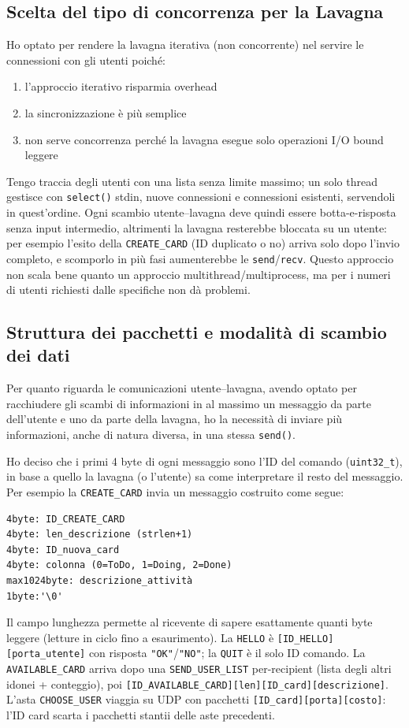\documentclass[10pt,a4paper, titlepage]{article}
\begin{document}
\subsection*{Scelta del tipo di concorrenza per la Lavagna}
Ho optato per rendere la lavagna iterativa (non concorrente) nel servire le connessioni con gli utenti poiché:
\begin{enumerate}
    \item l'approccio iterativo risparmia overhead
    \item la sincronizzazione è più semplice
    \item non serve concorrenza perché la lavagna esegue solo operazioni I/O bound leggere
\end{enumerate}
Tengo traccia degli utenti con una lista senza limite massimo; un solo thread gestisce con \texttt{select()} stdin, nuove connessioni e connessioni esistenti, servendoli in quest'ordine. Ogni scambio utente--lavagna deve quindi essere botta-e-risposta senza input intermedio, altrimenti la lavagna resterebbe bloccata su un utente: per esempio l'esito della \texttt{CREATE\_CARD} (ID duplicato o no) arriva solo dopo l'invio completo, e scomporlo in pi\`u fasi aumenterebbe le \texttt{send}/\texttt{recv}.
Questo approccio non scala bene quanto un approccio multithread/multiprocess, ma per i numeri di utenti richiesti dalle specifiche non dà problemi.
\subsection*{Struttura dei pacchetti e modalità di scambio dei dati}
Per quanto riguarda le comunicazioni utente--lavagna, avendo optato per racchiudere gli scambi di informazioni in al massimo un messaggio da parte dell'utente e uno da parte della lavagna, ho la necessità di inviare più informazioni, anche di natura diversa, in una stessa \texttt{send()}.

Ho deciso che i primi 4 byte di ogni messaggio sono l'ID del comando (\texttt{uint32\_t}), in base a quello la lavagna (o l'utente) sa come interpretare il resto del messaggio. Per esempio la \texttt{CREATE\_CARD} invia un messaggio costruito come segue:
\begin{verbatim}
4byte: ID_CREATE_CARD
4byte: len_descrizione (strlen+1)
4byte: ID_nuova_card
4byte: colonna (0=ToDo, 1=Doing, 2=Done)
max1024byte: descrizione_attività
1byte:'\0'
\end{verbatim}
Il campo lunghezza permette al ricevente di sapere esattamente quanti byte leggere (letture in ciclo fino a esaurimento). La \texttt{HELLO} \`e \texttt{[ID\_HELLO]}\allowbreak\texttt{[porta\_utente]} con risposta \texttt{"OK"}/\texttt{"NO"}; la \texttt{QUIT} \`e il solo ID comando. La \texttt{AVAILABLE\_CARD} arriva dopo una \texttt{SEND\_USER\_LIST} per-recipient (lista degli altri idonei + conteggio), poi \texttt{[ID\_AVAILABLE\_CARD]}\allowbreak\texttt{[len]}\allowbreak\texttt{[ID\_card]}\allowbreak\texttt{[descrizione]}. L'asta \texttt{CHOOSE\_USER} viaggia su UDP con pacchetti \texttt{[ID\_card]}\allowbreak\texttt{[porta]}\allowbreak\texttt{[costo]}: l'ID card scarta i pacchetti stantii delle aste precedenti.
\end{document}
